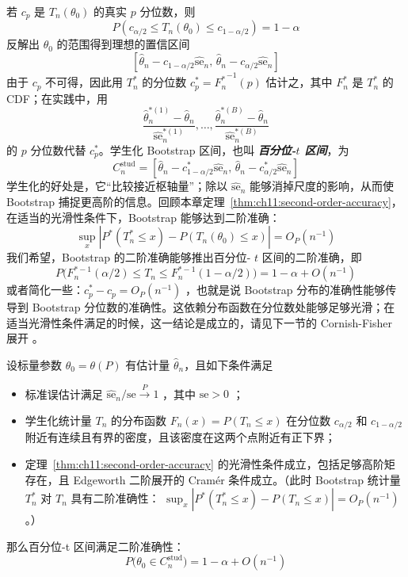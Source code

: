 若 $c_p$ 是 $T_n(\theta_0)$ 的真实 $p$ 分位数，则
\[P(c_{\alpha/2}\le T_n(\theta_0)\le c_{1-\alpha/2})=1-\alpha\]
反解出 $\theta_0$ 的范围得到理想的置信区间
\[\left[ \widehat\theta_n-c_{1-\alpha/2}\widehat{\mathrm{se}}_n,\, \widehat\theta_n-c_{\alpha/2}\widehat{\mathrm{se}}_n \right]\]
由于 $c_p$ 不可得，因此用 $T_n^*$ 的分位数 $c_p^*={F_n^*}^{-1}(p)$ 估计之，其中 $F_n^*$ 是 $T_n^*$ 的 CDF；在实践中，用
\[
\frac{\widehat\theta_n^{*(1)}-\widehat\theta_n}{\widehat{\mathrm{se}}_n^{*(1)}},
\dots,
\frac{\widehat\theta_n^{*(B)}-\widehat\theta_n}{\widehat{\mathrm{se}}_n^{*(B)}}
\]
的 $p$ 分位数代替 $c_p^*$。学生化 Bootstrap 区间，也叫 \textbf{\emph{百分位-$t$ 区间}}，为
\[C_n^{\mathrm{stud}} =\left[ \widehat\theta_n-c_{1-\alpha/2}^*\widehat{\mathrm{se}}_n,\, \widehat\theta_n-c_{\alpha/2}^*\widehat{\mathrm{se}}_n \right]\]
学生化的好处是，它``比较接近枢轴量''；除以 $\widehat{\mathrm{se}}_n$ 能够消掉尺度的影响，从而使 Bootstrap 捕捉更高阶的信息。回顾本章定理~\ref{thm:ch11:second-order-accuracy}，在适当的光滑性条件下，Bootstrap 能够达到二阶准确：
\[\sup_x \left| P^*(T_n^*\leq x)-P(T_n(\theta_0)\leq x) \right| =O_P(n^{-1})\]
我们希望，Bootstrap 的二阶准确能够推出百分位- $t$ 区间的二阶准确，即
\[P\big(F_n^{*-1}(\alpha/2)\le T_n\le F_n^{*-1}(1-\alpha/2)\big)= 1-\alpha+O(n^{-1})\]
或者简化一些：$c_p^*-c_p=O_P(n^{-1})$ ，也就是说 Bootstrap 分布的准确性能够传导到 Bootstrap 分位数的准确性。这依赖分布函数在分位数处能够足够光滑；在适当光滑性条件满足的时候，这一结论是成立的，请见下一节的 Cornish-Fisher 展开 。

\begin{theorem}\label{thm:ch11:percentile-t-second-order}

设标量参数 $\theta_0=\theta(P)$ 有估计量 $\widehat\theta_n$，且如下条件满足

\begin{itemize}
\tightlist
\item
  标准误估计满足 $\widehat{\mathrm{se}}_n/\mathrm{se}\overset P\to1$ ，其中 $\mathrm{se}>0$ ；
\item
  学生化统计量 $T_n$ 的分布函数 $F_n(x)=P(T_n\le x)$ 在分位数 $c_{\alpha/2}$ 和 $c_{1-\alpha/2}$ 附近有连续且有界的密度，且该密度在这两个点附近有正下界；
\item
  定理~\ref{thm:ch11:second-order-accuracy} 的光滑性条件成立，包括足够高阶矩存在，且 Edgeworth 二阶展开的 Cramér 条件成立。（此时 Bootstrap 统计量 $T_n^*$ 对 $T_n$ 具有二阶准确性： $\sup_x\left| P^*(T_n^*\le x)-P(T_n\le x) \right|= O_P(n^{-1})$ 。）
\end{itemize}

那么百分位-t 区间满足二阶准确性：
\[P\big(\theta_0\in C_n^{\text{stud}}\big)= 1-\alpha+O(n^{-1})\]
\end{theorem}

